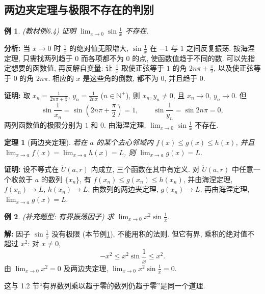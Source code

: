 \documentclass[UTF8,openany]{ctexbook}
\theoremstyle{chinesetextbook}
\newtheorem{example}{例}[section]
\newtheorem{theorem}{定理}[section]
\newenvironment{cnproof}{\par\indent\textbf{证明:} \ignorespaces}{\par}
\newenvironment{cnsolution}{\par\indent\textbf{解:} \ignorespaces}{\par}
\begin{document}
\subsection{两边夹定理与极限不存在的判别}
\begin{example}\label{ex:6-4}
\textnormal{(教材例6.4)} 证明 $\displaystyle\lim_{x\to0}\sin\frac1x$ 不存在.
\end{example}
\par\indent\textbf{分析:} 当 $x\to0$ 时 $\displaystyle\frac1x$ 的绝对值无限增大, $\displaystyle\sin\frac1x$ 在 $-1$ 与 $1$ 之间反复振荡. 按海涅定理, 只需找两列趋于 $0$ 而各项都不为 $0$ 的点, 使函数值趋于不同的数. 可以先指定想要的函数值, 再反解自变量: 让 $\displaystyle\frac1x$ 取使正弦等于 $1$ 的角 $\displaystyle2n\pi+\frac\pi2$, 以及使正弦等于 $0$ 的角 $2n\pi$. 相应的 $x$ 是这些角的倒数, 都不为 $0$, 并且趋于 $0$.
\begin{cnproof}
取 $\displaystyle x_n=\frac1{2n\pi+\frac\pi2}$, $\displaystyle y_n=\frac1{2n\pi}$ ($n\in\mathbb N^+$), 则 $x_n,y_n\ne0$, 且 $x_n\to0$, $y_n\to0$. 但
\[
\sin\frac1{x_n}=\sin\left(2n\pi+\frac\pi2\right)=1,\qquad\sin\frac1{y_n}=\sin2n\pi=0,
\]
两列函数值的极限分别为 $1$ 和 $0$. 由海涅定理, $\displaystyle\lim_{x\to0}\sin\frac1x$ 不存在.
\end{cnproof}
\begin{theorem}[两边夹定理]
若在 $a$ 的某个去心邻域内 $f(x)\le g(x)\le h(x)$, 并且 $\displaystyle\lim_{x\to a}f(x)=\lim_{x\to a}h(x)=L$, 则 $\displaystyle\lim_{x\to a}g(x)=L$.
\end{theorem}
\begin{cnproof}
设不等式在 $\mathring U(a,r)$ 内成立, 三个函数在其中有定义. 对 $\mathring U(a,r)$ 中任意一个收敛于 $a$ 的数列 $\{x_n\}$, 有 $f(x_n)\le g(x_n)\le h(x_n)$, 并由海涅定理, $f(x_n)\to L$, $h(x_n)\to L$. 由数列的两边夹定理, $g(x_n)\to L$. 再由海涅定理, $\displaystyle\lim_{x\to a}g(x)=L$.
\end{cnproof}
\begin{example}
\textnormal{(补充题型: 有界振荡因子)} 求 $\displaystyle\lim_{x\to0}x^2\sin\frac1x$.
\end{example}
\begin{cnsolution}
因子 $\displaystyle\sin\frac1x$ 没有极限 (本节例\ref{ex:6-4}), 不能用积的法则. 但它有界, 乘积的绝对值不超过 $x^2$: 对 $x\ne0$,
\[
-x^2\le x^2\sin\frac1x\le x^2.
\]
由 $\displaystyle\lim_{x\to0}x^2=0$ 及两边夹定理, $\displaystyle\lim_{x\to0}x^2\sin\frac1x=0$.
\end{cnsolution}
这与 1.2 节“有界数列乘以趋于零的数列仍趋于零”是同一个道理.
\end{document}
